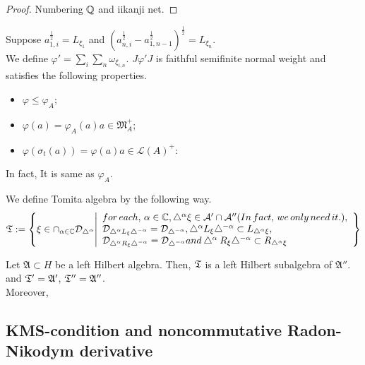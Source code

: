 \begin{proof}
  Numbering $\mathbb{Q}$ and iikanji net.
\end{proof}

Suppose $a_{1,i}^{\frac{1}{2}}=L_{\xi_1}$ and $(a_{n,i}^{\frac{1}{2}}-a_{1,n-1}^{\frac{1}{2}})^{\frac{1}{2}}=L_{\xi_n}$. \\
We define $\varphi'=\sum_i\sum_n \omega_{\xi_{i,n}}$. $J\varphi'J$ is faithful semifinite normal weight and satisfies the following properties.
\begin{itemize}
  \item $\varphi \leq \varphi_A$;
  \item $\varphi(a) = \varphi_A(a)  a \in \mathfrak{M}_A^+$;
  \item $\varphi(\sigma_t(a)) = \varphi(a)  a \in \mathcal{L}(A)^+$:
\end{itemize}

In fact, It is same as $\varphi_A$.

\begin{definition}
  We define Tomita algebra by the following way.
  \begin{align*}
    \mathfrak{T} := \left\{\xi \in \cap_{\alpha \in \mathbb{C}}\mathcal{D}_{\bigtriangleup^\alpha} \middle| \begin{array}{ll} for\, each,\, \alpha \in \mathbb{C}, \bigtriangleup^\alpha\xi \in \mathcal{A}'\cap\mathcal{A}''(In\, fact,\, we\, only\, need\, it.), \\
    \mathcal{D}_{\bigtriangleup^\alpha L_\xi \bigtriangleup^{-\alpha}} = \mathcal{D}_{\bigtriangleup^{-\alpha}}, \bigtriangleup^\alpha L_\xi \bigtriangleup^{-\alpha} \subset L_{\bigtriangleup^\alpha \xi},\\
    \mathcal{D}_{\bigtriangleup^\alpha R_\xi \bigtriangleup^{-\alpha}} = \mathcal{D}_{\bigtriangleup^{-\alpha}} and \bigtriangleup^\alpha R_\xi \bigtriangleup^{-\alpha} \subset R_{\bigtriangleup^\alpha \xi} \end{array} \right\}
  \end{align*}
\end{definition}

\begin{theorem}
  Let $\mathfrak{A} \subset H$ be a left Hilbert algebra. Then, $\mathfrak{T}$ is a left Hilbert subalgebra of $\mathfrak{A}''$. and $\mathfrak{T}' = \mathfrak{A}'$, $\mathfrak{T}'' = \mathfrak{A}''$. \\
  Moreover,
\end{theorem}

\subsection{KMS-condition and noncommutative Radon-Nikodym derivative}

